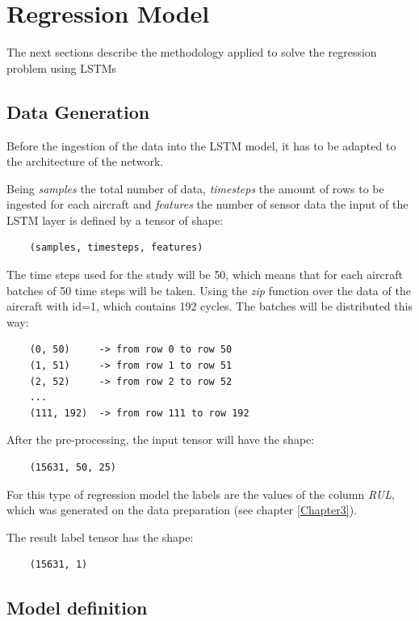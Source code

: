 \section{Regression Model}

The next sections describe the methodology applied to solve the regression problem using LSTMs


\subsection{Data Generation}

Before the ingestion of the data into the LSTM model, it has to be adapted to the architecture of the network.

Being \textit{samples} the total number of data, \textit{timesteps} the amount of rows to be ingested for each aircraft and \textit{features} the number of sensor data the input of the LSTM layer is defined by a tensor of shape:

\begin{verbatim}
    (samples, timesteps, features)
\end{verbatim}

The time steps used for the study will be 50, which means that for each aircraft batches of 50 time steps will be taken.
Using the \textit{zip} function over the data of the aircraft with id=1, which contains 192 cycles. The batches will be distributed this way:

\begin{verbatim}
    (0, 50)     -> from row 0 to row 50
    (1, 51)     -> from row 1 to row 51
    (2, 52)     -> from row 2 to row 52
    ...
    (111, 192)  -> from row 111 to row 192
\end{verbatim}

After the pre-processing, the input tensor will have the shape:

\begin{verbatim}
    (15631, 50, 25)
\end{verbatim}

For this type of regression model the labels are the values of the column \textit{RUL}, which was generated on the data preparation (see chapter \ref{Chapter3}).

The result label tensor has the shape:

\begin{verbatim}
    (15631, 1)
\end{verbatim}


\subsection{Model definition}

